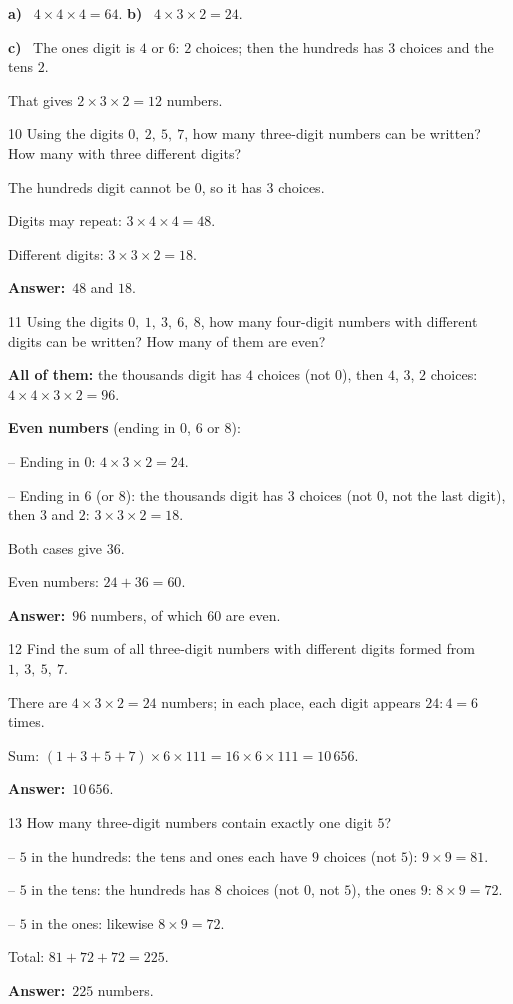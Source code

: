 \documentclass[11pt]{article}
\newif\ifsol \solfalse
\providecommand{\AnsWord}{Đáp số}
\newcommand{\dapso}[1]{\par\textbf{\AnsWord:}\ #1}
\newcommand{\probsol}[1]{%
  \begin{lrbox}{\solmeasure}\begin{minipage}{\dimexpr\linewidth-24pt\relax}#1\end{minipage}\end{lrbox}%
  \ifsol
    \begin{solbox}#1\end{solbox}%
  \else
    \setlength{\solht}{\dimexpr\ht\solmeasure+\dp\solmeasure+0.85cm\relax}%
    \ifdim\solht<1.35cm\setlength{\solht}{1.35cm}\fi
    \begin{tcolorbox}[colback=white,colframe=Line,boxrule=0.8pt,arc=5pt,
      left=8pt,right=8pt,top=4pt,bottom=4pt,height=\solht]{\footnotesize\color{Slate}\itshape\WorkWord}\end{tcolorbox}%
  \fi}
\newcommand{\pa}[1]{\textbf{#1)}\ }
\newcommand{\gap}{\vspace{0.3cm}}
\def\WorkWord{Your work:}
\def\AnsWord{Answer}
\begin{document}
\probsol{
\pa{a} $4\times4\times4=64$. \qquad \pa{b} $4\times3\times2=24$.\par
\pa{c} The ones digit is $4$ or $6$: $2$ choices; then the hundreds has $3$ choices and the tens $2$.\par That gives $2\times3\times2=12$ numbers.
}
\gap
\begin{probbox}{10}{\relax}
Using the digits $0,\ 2,\ 5,\ 7$, how many three-digit numbers can be written? How many with three different digits?
\end{probbox}
\probsol{
The hundreds digit cannot be $0$, so it has $3$ choices.\par
Digits may repeat: $3\times4\times4=48$.\par Different digits: $3\times3\times2=18$.
\dapso{$48$ and $18$.}}
\gap
\begin{probbox}{11}{\relax}
Using the digits $0,\ 1,\ 3,\ 6,\ 8$, how many four-digit numbers with different digits can be written? How many of them are even?
\end{probbox}
\probsol{
\textbf{All of them:} the thousands digit has $4$ choices (not $0$), then $4$, $3$, $2$ choices: $4\times4\times3\times2=96$.\par
\textbf{Even numbers} (ending in $0$, $6$ or $8$):\par
-- Ending in $0$: $4\times3\times2=24$.\par
-- Ending in $6$ (or $8$): the thousands digit has $3$ choices (not $0$, not the last digit), then $3$ and $2$: $3\times3\times2=18$.\par Both cases give $36$.\par
Even numbers: $24+36=60$.
\dapso{$96$ numbers, of which $60$ are even.}}
\gap
\begin{probbox}{12}{\relax}
Find the sum of all three-digit numbers with different digits formed from $1,\ 3,\ 5,\ 7$.
\end{probbox}
\probsol{
There are $4\times3\times2=24$ numbers; in each place, each digit appears $24:4=6$ times.\par
Sum: $(1+3+5+7)\times6\times111=16\times6\times111=10\,656$.
\dapso{$10\,656$.}}
\gap
\begin{probbox}{13}{\relax}
How many three-digit numbers contain exactly one digit $5$?
\end{probbox}
\probsol{
-- $5$ in the hundreds: the tens and ones each have $9$ choices (not $5$): $9\times9=81$.\par
-- $5$ in the tens: the hundreds has $8$ choices (not $0$, not $5$), the ones $9$: $8\times9=72$.\par
-- $5$ in the ones: likewise $8\times9=72$.\par
Total: $81+72+72=225$.
\dapso{$225$ numbers.}}
\end{document}
